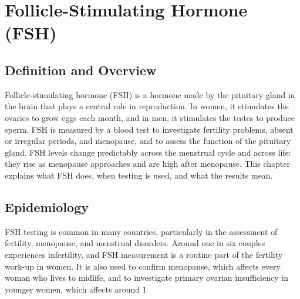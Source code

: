 \chapter{Follicle-Stimulating Hormone (FSH)}

\section*{Definition and Overview}
Follicle-stimulating hormone (FSH) is a hormone made by the pituitary gland in the brain that plays a central role in reproduction. In women, it stimulates the ovaries to grow eggs each month, and in men, it stimulates the testes to produce sperm. FSH is measured by a blood test to investigate fertility problems, absent or irregular periods, and menopause, and to assess the function of the pituitary gland. FSH levels change predictably across the menstrual cycle and across life: they rise as menopause approaches and are high after menopause. This chapter explains what FSH does, when testing is used, and what the results mean.

\section*{Epidemiology}
FSH testing is common in many countries, particularly in the assessment of fertility, menopause, and menstrual disorders. Around one in six couples experiences infertility, and FSH measurement is a routine part of the fertility work-up in women. It is also used to confirm menopause, which affects every woman who lives to midlife, and to investigate primary ovarian insufficiency in younger women, which affects around 1%

